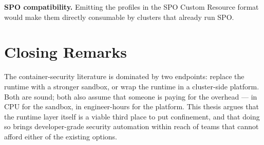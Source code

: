 \textbf{SPO compatibility.} Emitting the profiles in the SPO Custom Resource format would make them directly consumable by clusters that already run SPO.

\section{Closing Remarks}

The container-security literature is dominated by two endpoints: replace the runtime with a stronger sandbox, or wrap the runtime in a cluster-side platform. Both are sound; both also assume that someone is paying for the overhead --- in CPU for the sandbox, in engineer-hours for the platform. This thesis argues that the runtime layer itself is a viable third place to put confinement, and that doing so brings developer-grade security automation within reach of teams that cannot afford either of the existing options.
